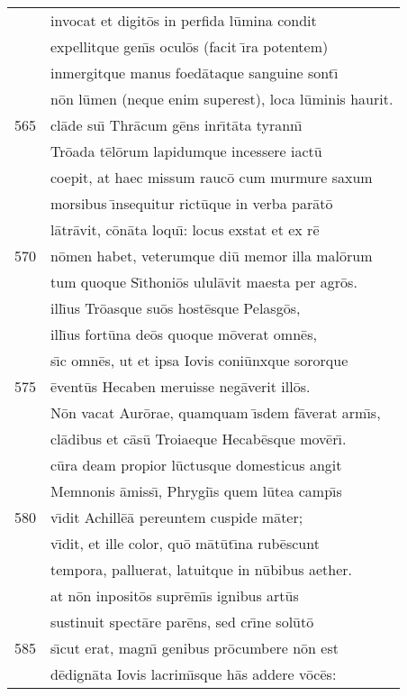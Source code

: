 \documentclass[paper=6in:9in,pagesize=pdftex,
               headinclude=on,footinclude=on,12pt]{scrbook}
\begin{document}
\begin{longtable}[p]{ r l }
 & invocat et digit\=os in perfida l\=umina condit\\ 
 & expellitque gen\={\i}s ocul\=os (facit \={\i}ra potentem)\\ 
 & inmergitque manus foed\=ataque sanguine sont\={\i}\\ 
 & n\=on l\=umen (neque enim superest), loca l\=uminis haurit.\\ 
565 & cl\=ade su\={\i} Thr\=acum g\=ens inr\={\i}t\=ata tyrann\={\i}\\ 
 & Tr\=oada t\=el\=orum lapidumque incessere iact\=u\\ 
 & coepit, at haec missum rauc\=o cum murmure saxum\\ 
 & morsibus \={\i}nsequitur rict\=uque in verba par\=at\=o\\ 
 & l\=atr\=avit, c\=on\=ata loqu\={\i}: locus exstat et ex r\=e\\ 
570 & n\=omen habet, veterumque di\=u memor illa mal\=orum\\ 
 & tum quoque S\={\i}thoni\=os ulul\=avit maesta per agr\=os.\\ 
 & ill\={\i}us Tr\=oasque su\=os host\=esque Pelasg\=os,\\ 
 & ill\={\i}us fort\=una de\=os quoque m\=overat omn\=es,\\ 
 & s\={\i}c omn\=es, ut et ipsa Iovis coni\=unxque sororque\\ 
575 & \=event\=us Hecaben meruisse neg\=averit ill\=os.\\ 
 & \indent N\=on vacat Aur\=orae, quamquam \={\i}sdem f\=averat arm\={\i}s,\\ 
 & cl\=adibus et c\=as\=u Troiaeque Hecab\=esque mov\=er\={\i}.\\ 
 & c\=ura deam propior l\=uctusque domesticus angit\\ 
 & Memnonis \=amiss\={\i}, Phrygi\={\i}s quem l\=utea camp\={\i}s\\ 
580 & v\={\i}dit Achill\=e\=a pereuntem cuspide m\=ater;\\ 
 & v\={\i}dit, et ille color, qu\=o m\=at\=ut\={\i}na rub\=escunt\\ 
 & tempora, palluerat, latuitque in n\=ubibus aether.\\ 
 & at n\=on inposit\=os supr\=em\={\i}s ignibus art\=us\\ 
 & sustinuit spect\=are par\=ens, sed cr\={\i}ne sol\=ut\=o\\ 
585 & s\={\i}cut erat, magn\={\i} genibus pr\=ocumbere n\=on est\\ 
 & d\=edign\=ata Iovis lacrim\={\i}sque h\=as addere v\=oc\=es:\\ 

\end{longtable}
\end{document}
